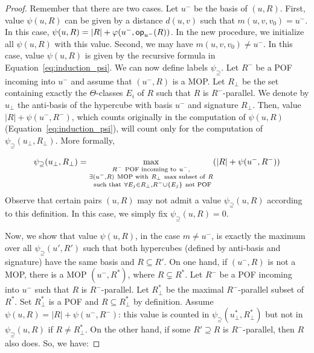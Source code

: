 \documentclass{article}
\newcommand{\set}[1]{\left\{ #1 \right\}}
\newcommand{\card}[1]{\left| #1 \right|}
\newcommand{\opp}{\mbox{\textsf{op}}}
\newcommand{\psis}{\psi_{\supseteq}}
\begin{document}
\begin{proof}
Remember that there are two cases. Let $u^-$ be the basis of $(u,R)$. First, value $\psi(u,R)$ can be given by a distance $d(u,v)$ such that $m(u,v,v_0) = u^-$. In this case, $\psi(u,R) = \card{R} + \varphi(u^-,\opp_{u^-}(R))$. In the new procedure, we initialize all $\psi(u,R)$ with this value. Second, we may have $m(u,v,v_0) \neq u^-$. In this case, value $\psi(u,R)$ is given by the recursive formula in Equation~\eqref{eq:induction_psi}. We can now define labels $\psis$. Let $R^-$ be a POF incoming into $u^-$ and assume that $(u^-,R)$ is a MOP. Let $R_{\perp}$ be the set containing exactly the $\Theta$-classes $E_i$ of $R$ such that $R$ is $R^-$-parallel. We denote by $u_{\perp}$ the anti-basis of the hypercube with basis $u^-$ and signature $R_{\perp}$. Then, value $\card{R} + \psi(u^-,R^-)$, which counts originally in the computation of $\psi(u,R)$ (Equation~\eqref{eq:induction_psi}), will count only for the computation of $\psis(u_{\perp},R_{\perp})$. More formally,

\begin{equation}
    \psis(u_{\perp},R_{\perp}) = \max\limits_{\substack{R^- ~\mbox{\scriptsize{POF incoming to}}~ u^-, \\ \exists (u^-,R) ~\mbox{\scriptsize{MOP with}}~ R_{\perp} ~\mbox{\scriptsize{max subset of}}~ R\\ ~\mbox{\scriptsize{such that}}~ \forall E_j \in R_{\perp}, R^- \cup \set{E_j} ~\mbox{\scriptsize{not POF}}}} (\card{R} + \psi(u^-,R^-))
    \label{eq:induction_psi_mop}
\end{equation}
Observe that certain pairs $(u,R)$ may not admit a value $\psis(u,R)$ according to this definition. In this case, we simply fix $\psis(u,R) = 0$.

Now, we show that value $\psi(u,R)$, in the case $m\neq u^-$, is exactly the maximum over all $\psis(u',R')$ such that both hypercubes (defined by anti-basis and signature) have the same basis and $R \subseteq R'$. On one hand, if $(u^-,R)$ is not a MOP, there is a MOP $(u^-,R^*)$, where $R \subsetneq R^*$. Let $R^-$ be a POF incoming into $u^-$ such that $R$ is $R^-$-parallel. Let $R_{\perp}^*$ be the maximal $R^-$-parallel subset of $R^*$. Set $R_{\perp}^*$ is a POF and $R \subseteq R_{\perp}^*$ by definition. Assume $\psi(u,R) = \card{R} + \psi(u^-,R^-)$: this value is counted in $\psis(u_{\perp}^*,R_{\perp}^*)$ but not in $\psis(u,R)$ if $R\neq R_{\perp}^*$. On the other hand, if some $R' \supseteq R$ is $R^-$-parallel, then $R$ also does. So, we have:


\end{proof}
\end{document}
